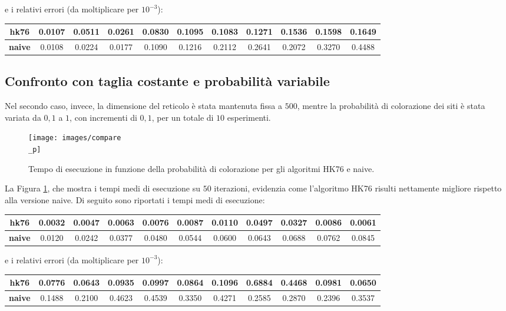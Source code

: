 \vspace{15px}
\noindent
e i relativi errori (da moltiplicare per $10^{-3}$):

\vspace{15px}
\noindent
\begin{tabular}{|c|*{10}{c|}}
	\hline
	\textbf{hk76}  & 0.0107  &  0.0511    &0.0261 &   0.0830   & 0.1095   & 0.1083  &  0.1271  &  0.1536  &  0.1598  &  0.1649\\
	\hline
	\textbf{naive}  &0.0108  &  0.0224  &  0.0177  &  0.1090  &  0.1216  &  0.2112   & 0.2641  &  0.2072&    0.3270  &  0.4488\\
	\hline
\end{tabular}

\subsection{Confronto con taglia costante e probabilità variabile}
Nel secondo caso, invece, la dimensione del reticolo è stata mantenuta fissa a $500$, mentre la probabilità di colorazione dei siti è stata variata da $0{,}1$ a $1$, con incrementi di $0{,}1$, per un totale di $10$ esperimenti. 
\begin{figure}[H]
	\centering
	\texttt{[image: images/compare\\\_p]}
	\caption{Tempo di esecuzione in funzione della probabilità di colorazione per gli algoritmi HK76 e naive.}
	\label{fig:comparep}
\end{figure}
\noindent
La Figura \ref{fig:comparep}, che mostra i tempi medi di esecuzione su $50$ iterazioni, evidenzia come l’algoritmo HK76 risulti nettamente migliore rispetto alla versione naive. Di seguito sono riportati i tempi medi di esecuzione:

\vspace{15px}
\noindent
\begin{tabular}{|c|*{10}{c|}}
	\hline
	\textbf{hk76} &0.0032 &   0.0047 &   0.0063  &  0.0076 &   0.0087   &  0.0110   & 0.0497  &  0.0327    &0.0086    & 0.0061 \\
	\hline
	\textbf{naive} &0.0120 &   0.0242 &   0.0377   & 0.0480  &  0.0544 &   0.0600  &  0.0643  &  0.0688 &   0.0762 &   0.0845
	\\
	\hline
\end{tabular}

\vspace{15px}
\noindent
e i relativi errori (da moltiplicare per $10^{-3}$):

\vspace{15px}
\noindent
\begin{tabular}{|c|*{10}{c|}}
	\hline
	\textbf{hk76}  & 0.0776  &  0.0643 &   0.0935 &   0.0997&    0.0864  &  0.1096   & 0.6884  &  0.4468&    0.0981  &  0.0650\\
	\hline
	\textbf{naive}  & 0.1488  &  0.2100 &   0.4623  &  0.4539 &   0.3350  &  0.4271 &   0.2585  &  0.2870 &   0.2396 &   0.3537\\
	\hline
\end{tabular}

\vspace{15px}
\noindent